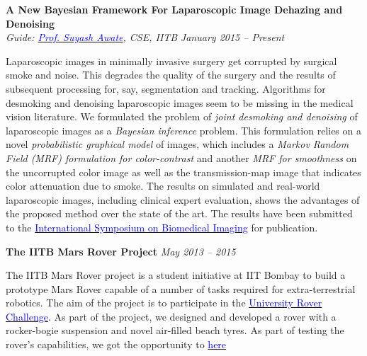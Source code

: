 \documentclass[margin,line]{res}
\newenvironment{list1}{
  \begin{list}{\ding{113}}{%
      \setlength{\itemsep}{0in}
      \setlength{\parsep}{0in} \setlength{\parskip}{0in}
      \setlength{\topsep}{0in} \setlength{\partopsep}{0in} 
      \setlength{\leftmargin}{0.17in}}}{\end{list}}
\begin{document}
\begin{resume}
{\bf A New Bayesian Framework For Laparoscopic Image Dehazing and Denoising} \\
{\em Guide: \href{https://www.cse.iitb.ac.in/~suyash}{\textcolor{blue}{Prof. Suyash Awate}}, CSE, IITB} \hfill {\it January 2015 -- Present}\\
\vspace*{-.13in}
\begin{list1}
\item[]
Laparoscopic images in minimally invasive surgery get corrupted by surgical smoke and noise. This degrades the quality of the surgery and the results of subsequent processing for, say, segmentation and tracking. Algorithms for desmoking and denoising laparoscopic images seem to be missing in the medical vision literature. We formulated the problem of {\em joint desmoking and denoising} of laparoscopic images as a {\em Bayesian inference} problem. This formulation relies on a novel {\em probabilistic graphical model} of images, which includes a {\em Markov Random Field (MRF) formulation for color-contrast} and another {\em MRF for smoothness} on the uncorrupted color image as well as the transmission-map image that indicates color attenuation due to smoke. The results on simulated and real-world laparoscopic images, including clinical expert evaluation, shows the advantages of the proposed method over the state of the art. The results have been submitted to the \href{http://biomedicalimaging.org/2016/}{\textcolor{blue} {International Symposium on Biomedical Imaging}} for publication.
\end{list1}

{\bf The IITB Mars Rover Project}
\hfill {\it May 2013 -- 2015}\\
\vspace*{-.13in}
\begin{list1}
\item[]
The IITB Mars Rover project is a student initiative at IIT Bombay to build a prototype Mars Rover capable of a number of tasks required for extra-terrestrial robotics. The aim of the project is to participate in the \href{urc.marssociety.org/}{\textcolor{blue} {University Rover Challenge}}. As part of the project, we designed and developed a rover with a rocker-bogie suspension and novel air-filled beach tyres. 
%
As part of testing the rover's capabilities, we got the opportunity to \href{http://www.nssa.com.au/14asrc/14ASRC-proceedings.zip}{\textcolor{blue} {here}}
\end{list1}


\end{resume}
\end{document}

